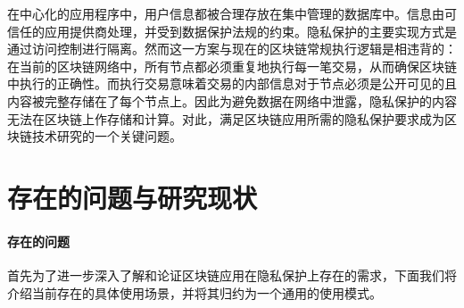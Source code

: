 在中心化的应用程序中，用户信息都被合理存放在集中管理的数据库中。信息由可信任的应用提供商处理，并受到数据保护法规的约束。隐私保护的主要实现方式是通过访问控制进行隔离。然而这一方案与现在的区块链常规执行逻辑是相违背的：在当前的区块链网络中，所有节点都必须重复地执行每一笔交易，从而确保区块链中执行的正确性。而执行交易意味着交易的内部信息对于节点必须是公开可见的且内容被完整存储在了每个节点上。因此为避免数据在网络中泄露，隐私保护的内容无法在区块链上作存储和计算。对此，满足区块链应用所需的隐私保护要求成为区块链技术研究的一个关键问题。

\section{存在的问题与研究现状}
\paragraph{存在的问题} 首先为了进一步深入了解和论证区块链应用在隐私保护上存在的需求，下面我们将介绍当前存在的具体使用场景，并将其归约为一个通用的使用模式。

